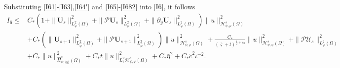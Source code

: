 \documentclass{amsart}
\numberwithin{equation}{section}
\newcommand\y{{{\langle y \rangle}}}
\begin{document}
Substituting \eqref{I61}-\eqref{I63},\eqref{I64'} and \eqref{I65}-\eqref{I682} into \eqref{I6}, it follows
\begin{align*}
I_{6}
\leq& C_{*}\left(1
        +\|\mathbf{U}_{s}\|_{L_{\varphi}^{2}(\Omega)}^{2}
        +\|\mathcal{P}\mathbf{U}_{s}\|_{L_{\varphi}^{2}(\Omega)}^{2}
        +\|\partial_{y}\mathbf{U}_{s}\|_{L_{\varphi}^{2}(\Omega)}^{2}\right)
       \|u\|_{\mathcal{H}_{\psi,\varphi}^{s}(\Omega)}^{2}\\
    &+C_{*}\left(\|\mathbf{U}_{s+1}\|_{L_{\hat{\varphi}}^{2}(\Omega)}^{2}
        +\|\mathcal{P}\mathbf{U}_{s+1}\|_{L_{\hat{\varphi}}^{2}(\Omega)}^{2}\right)\|u\|_{\mathcal{H}_{\psi,\varphi}^{s}(\Omega)}^{2}
        +\frac{C_{*}}{(\bar{\varsigma}+t)^{\frac{1}{2}+\varepsilon_{0}}}\|u\|_{\mathcal{H}_{\psi,\varphi}^{s}(\Omega)}^{2}
     +\|\mathcal{P}\mathcal{U}_{s}\|_{L_{\varphi}^{2}(\Omega)}^{2}\\
    &+C_{*}\|u\|_{\hat{H}_{\psi,\y}^{s}(\Omega)}^{2}
     +C_{*}t\|u\|_{L_{t}^{2}\mathcal{H}_{\psi,\varphi}^{s}(\Omega)}^{2}
     +C_{*}\bar{\eta}^{2}
     +C_{*}\check{c}^{2}\iota^{-2}.
\end{align*}
\end{document}
